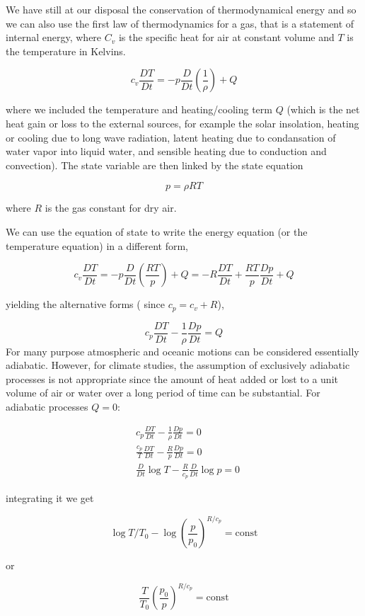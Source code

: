 We have still at our disposal the conservation of thermodynamical energy and so we can also use the first law of thermodynamics for a gas, that is a statement of internal energy, where $C_v$ is the specific heat for air at constant volume and $T$ is the temperature in Kelvins.

\[c_v\frac{D T}{Dt} = -p\frac{D }{Dt}\left(\frac{1}{\rho}\right)+ Q\]

where we included the temperature and heating/cooling term \(Q\) (which is the net heat gain or loss to the external sources, for example the solar insolation, heating or cooling due to long wave radiation, latent heating due to condansation of water vapor into liquid water, and sensible heating due to conduction and convection). The state variable are then linked by the state equation

\[p = \rho R T\]

where \(R\) is the gas constant for dry air.

We can use the equation of state to write the energy equation (or the temperature equation) in a different form,

\[c_v\frac{D T}{Dt} = -p\frac{D }{Dt}\left(\frac{R T}{p}\right)+ Q = -R\frac{D T}{Dt} + \frac{RT}{p}\frac{D p}{Dt} + Q\]

yielding the alternative forms ( since \(c_p = c_v +R\)),

\[c_p\frac{D T}{Dt}  - \frac{1}{\rho}\frac{D p}{Dt} = Q\]
For many purpose atmospheric and oceanic motions can be considered essentially adiabatic. However, for climate studies, the assumption of exclusively adiabatic processes is not appropriate since the amount of heat added or lost to a unit volume of air or water over a long period of time can be substantial. For adiabatic processes \(Q=0\):

\[\begin{aligned}
		 & c_p\frac{D T}{Dt}  - \frac{1}{\rho}\frac{D p}{Dt} = 0        \\
		 & \frac{c_p}{T}\frac{D T}{Dt} -\frac{R}{p}\frac{D p}{Dt} = 0   \\
		 & \frac{D }{Dt}\log{T} - \frac{R}{c_p}\frac{D }{Dt}\log{p} = 0
	\end{aligned}\]

integrating it we get

\[\log{T/T_0} - \log{\left(\frac{p}{p_0}\right)^{R/c_p}} = \text{const}\]

or

\[\frac{T}{T_0}\left(\frac{p_0}{p}\right)^{R/c_p} = \text{const}\]

